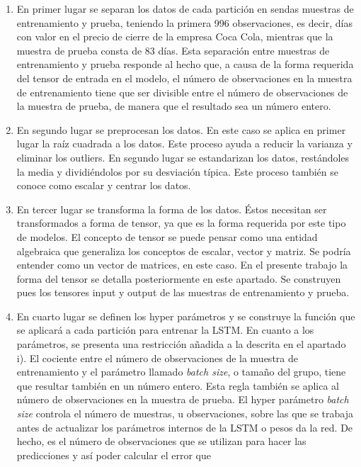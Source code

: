 \documentclass[]{article}
\begin{document}
\begin{enumerate}
\def\labelenumi{\roman{enumi})}
\item
  En primer lugar se separan los datos de cada partición en sendas
  muestras de entrenamiento y prueba, teniendo la primera 996
  observaciones, es decir, días con valor en el precio de cierre de la
  empresa Coca Cola, mientras que la muestra de prueba consta de 83
  días. Esta separación entre muestras de entrenamiento y prueba
  responde al hecho que, a causa de la forma requerida del tensor de
  entrada en el modelo, el número de observaciones en la muestra de
  entrenamiento tiene que ser divisible entre el número de observaciones
  de la muestra de prueba, de manera que el resultado sea un número
  entero.
\item
  En segundo lugar se preprocesan los datos. En este caso se aplica en
  primer lugar la raíz cuadrada a los datos. Este proceso ayuda a
  reducir la varianza y eliminar los outliers. En segundo lugar se
  estandarizan los datos, restándoles la media y dividiéndolos por su
  desviación típica. Este proceso también se conoce como escalar y
  centrar los datos.
\item
  En tercer lugar se transforma la forma de los datos. Éstos necesitan
  ser transformados a forma de tensor, ya que es la forma requerida por
  este tipo de modelos. El concepto de tensor se puede pensar como una
  entidad algebraica que generaliza los conceptos de escalar, vector y
  matriz. Se podría entender como un vector de matrices, en este caso.
  En el presente trabajo la forma del tensor se detalla posteriormente
  en este apartado. Se construyen pues los tensores input y output de
  las muestras de entrenamiento y prueba.
\item
  En cuarto lugar se definen los hyper parámetros y se construye la
  función que se aplicará a cada partición para entrenar la LSTM. En
  cuanto a los parámetros, se presenta una restricción añadida a la
  descrita en el apartado i). El cociente entre el número de
  observaciones de la muestra de entrenamiento y el parámetro llamado
  \emph{batch size}, o tamaño del grupo, tiene que resultar también en
  un número entero. Esta regla también se aplica al número de
  observaciones en la muestra de prueba. El hyper parámetro \emph{batch
  size} controla el número de muestras, u observaciones, sobre las que
  se trabaja antes de actualizar los parámetros internos de la LSTM o
  pesos da la red. De hecho, es el número de observaciones que se
  utilizan para hacer las predicciones y así poder calcular el error que

\end{enumerate}
\end{document}
